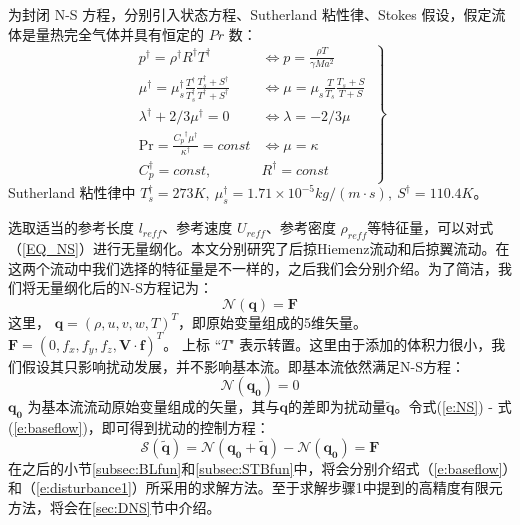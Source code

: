 为封闭 N-S 方程，分别引入状态方程、Sutherland 粘性律、Stokes 假设，假定流体是量热完全气体并具有恒定的 $Pr$ 数：
\begin{equation}\left.
\begin{aligned}
p^\dagger=\rho^\dagger R^\dagger T^\dagger & \Leftrightarrow p=\frac{\rho T}{\gamma Ma^2} \\
\mu^\dagger=\mu_s^\dagger\frac{T^\dagger}{T^\dagger_s}\frac{T^\dagger_s+S^\dagger}{T^\dagger+S^\dagger} & \Leftrightarrow \mu=\mu_s\frac{T}{T_s}\frac{T_s+S}{T+S} \\
\lambda^\dagger+2/3\mu^\dagger=0 & \Leftrightarrow\lambda=-2/3\mu\\
\textrm{Pr}=\frac{{C_p}^\dagger\mu^\dagger}{\kappa^\dagger}={const} & \Leftrightarrow\mu=\kappa\\
C_p^\dagger=const,~ & R^\dagger=const
\end{aligned}~\right\}
\end{equation}
Sutherland 粘性律中 $T^\dagger_s=273K,~\mu_s^\dagger=1.71\times10^{-5}kg/(m\cdot s),~S^\dagger=110.4K$。

选取适当的参考长度 $l_{reff}$、参考速度 $U_{reff}$、参考密度 $\rho_{reff}$等特征量，可以对式（\ref{EQ_NS}）进行无量纲化。本文分别研究了后掠Hiemenz流动和后掠翼流动。在这两个流动中我们选择的特征量是不一样的，之后我们会分别介绍。为了简洁，我们将无量纲化后的N-S方程记为：
\begin{equation}
    \label{e:NS}
    \mathscr{N}(\mathbf{q})=\mathbf{F}
\end{equation}
这里， $\mathbf{q}=(\rho , u,v,w,T)^T$，即原始变量组成的5维矢量。$\mathbf{F}=(0,f_x,f_y,f_z,\mathbf{V} \cdot \mathbf{f})^T$。 上标 ``$T$" 表示转置。这里由于添加的体积力很小，我们假设其只影响扰动发展，并不影响基本流。即基本流依然满足N-S方程：
\begin{equation}
    \label{e:baseflow}
    \mathscr{N}(\mathbf{q_0})=0
\end{equation}
$\mathbf{q_0}$ 为基本流流动原始变量组成的矢量，其与$\mathbf{q}$的差即为扰动量$\mathbf{\tilde{q}}$。令式(\ref{e:NS}) - 式(\ref{e:baseflow})，即可得到扰动的控制方程：
\begin{equation}
    \label{e:disturbance1}
    \mathscr{S}(\mathbf{\tilde{q}})=\mathscr{N}(\mathbf{q_0}+\mathbf{\tilde{q}})-\mathscr{N}(\mathbf{q_0})=\mathbf{F}
\end{equation}
在之后的小节\ref{subsec:BLfun}和\ref{subsec:STBfun}中，将会分别介绍式（\ref{e:baseflow}）和（\ref{e:disturbance1}）所采用的求解方法。至于求解步骤1中提到的高精度有限元方法，将会在\ref{sec:DNS}节中介绍。
